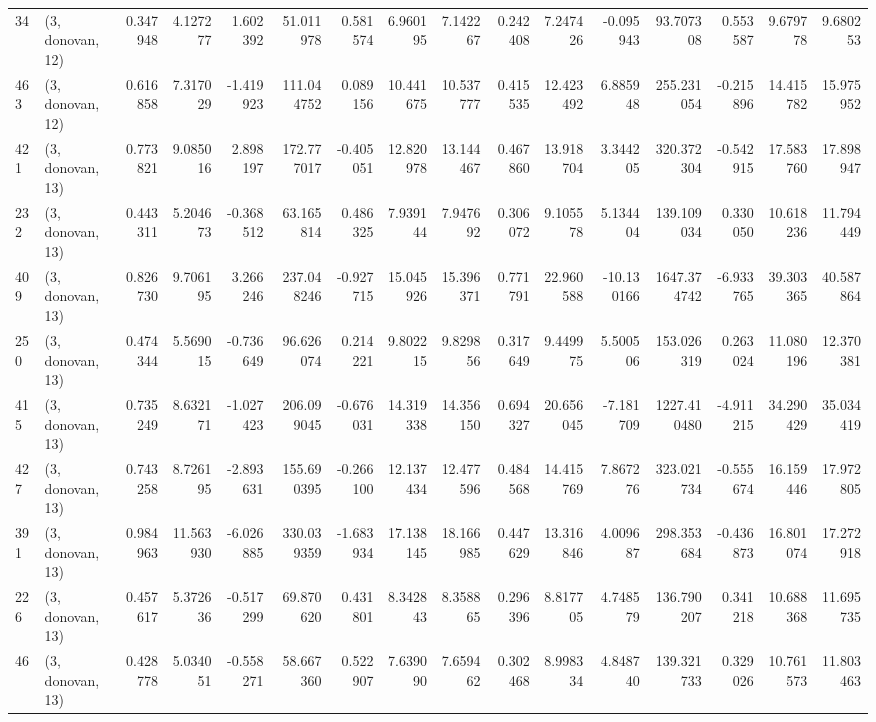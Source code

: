 \begin{tabular}{llrrrrrrrrrrrrrr}
34  &  (3, donovan, 12) &   0.347948 &   4.127277 &   1.602392 &    51.011978 &   0.581574 &   6.960195 &   7.142267 &  0.242408 &   7.247426 &  -0.095943 &     93.707308 &    0.553587 &    9.679778 &    9.680253 \\
463 &  (3, donovan, 12) &   0.616858 &   7.317029 &  -1.419923 &   111.044752 &   0.089156 &  10.441675 &  10.537777 &  0.415535 &  12.423492 &   6.885948 &    255.231054 &   -0.215896 &   14.415782 &   15.975952 \\
421 &  (3, donovan, 13) &   0.773821 &   9.085016 &   2.898197 &   172.777017 &  -0.405051 &  12.820978 &  13.144467 &  0.467860 &  13.918704 &   3.344205 &    320.372304 &   -0.542915 &   17.583760 &   17.898947 \\
232 &  (3, donovan, 13) &   0.443311 &   5.204673 &  -0.368512 &    63.165814 &   0.486325 &   7.939144 &   7.947692 &  0.306072 &   9.105578 &   5.134404 &    139.109034 &    0.330050 &   10.618236 &   11.794449 \\
409 &  (3, donovan, 13) &   0.826730 &   9.706195 &   3.266246 &   237.048246 &  -0.927715 &  15.045926 &  15.396371 &  0.771791 &  22.960588 & -10.130166 &   1647.374742 &   -6.933765 &   39.303365 &   40.587864 \\
250 &  (3, donovan, 13) &   0.474344 &   5.569015 &  -0.736649 &    96.626074 &   0.214221 &   9.802215 &   9.829856 &  0.317649 &   9.449975 &   5.500506 &    153.026319 &    0.263024 &   11.080196 &   12.370381 \\
415 &  (3, donovan, 13) &   0.735249 &   8.632171 &  -1.027423 &   206.099045 &  -0.676031 &  14.319338 &  14.356150 &  0.694327 &  20.656045 &  -7.181709 &   1227.410480 &   -4.911215 &   34.290429 &   35.034419 \\
427 &  (3, donovan, 13) &   0.743258 &   8.726195 &  -2.893631 &   155.690395 &  -0.266100 &  12.137434 &  12.477596 &  0.484568 &  14.415769 &   7.867276 &    323.021734 &   -0.555674 &   16.159446 &   17.972805 \\
391 &  (3, donovan, 13) &   0.984963 &  11.563930 &  -6.026885 &   330.039359 &  -1.683934 &  17.138145 &  18.166985 &  0.447629 &  13.316846 &   4.009687 &    298.353684 &   -0.436873 &   16.801074 &   17.272918 \\
226 &  (3, donovan, 13) &   0.457617 &   5.372636 &  -0.517299 &    69.870620 &   0.431801 &   8.342843 &   8.358865 &  0.296396 &   8.817705 &   4.748579 &    136.790207 &    0.341218 &   10.688368 &   11.695735 \\
46  &  (3, donovan, 13) &   0.428778 &   5.034051 &  -0.558271 &    58.667360 &   0.522907 &   7.639090 &   7.659462 &  0.302468 &   8.998334 &   4.848740 &    139.321733 &    0.329026 &   10.761573 &   11.803463 \\

\end{tabular}
